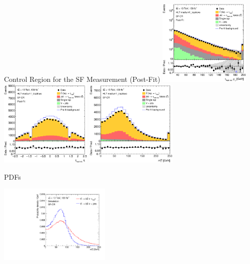 \documentclass[11pt, xcolor={dvipsnames}, aspectratio=169]{beamer}
\begin{document}
\begin{frame}{Control Region for the SF Measurement (Post-Fit)}
  \includegraphics[width=0.33\textwidth]{ttbarSF/postfit_sfcr/PTVR_postFit}%
  \includegraphics[width=0.33\textwidth]{ttbarSF/postfit_sfcr/ETAVR_postFit}%
  \includegraphics[width=0.33\textwidth]{ttbarSF/postfit_sfcr/MTWVR_postFit}
\end{frame}


\begin{frame}{\allbold{\mtw} PDFs}
  \centering

  \includegraphics[width=0.4\textwidth]{ttbarSF/mtw_pdf}
\end{frame}

\end{document}
